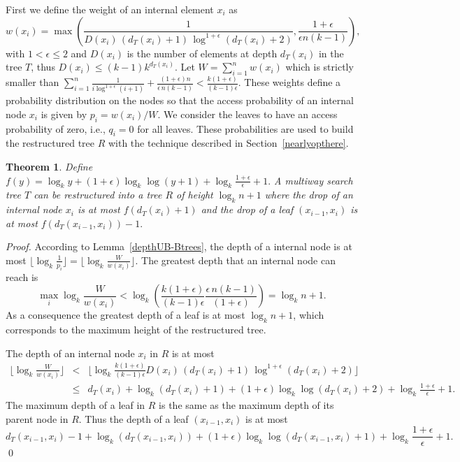 \documentclass{llncs}\usepackage[english]{babel}
\newtheorem{thm}{Theorem}
\begin{document}
First we define the weight of an internal element $x_i$ as
$$
w(x_i)=\max \left( \frac{1}{D(x_i) \, (d_T(x_i)+1)\, \log^{1+\epsilon}(d_T(x_i)+2)},\frac{1+\epsilon}{\epsilon n (k-1)} \right),
$$
with $1<\epsilon \leq 2$ and $D(x_i)$ is the number of elements at depth $d_T(x_i)$ in the tree $T$, thus $D(x_i)\leq (k-1)k^{d_T(x_i)}$. Let $W=\sum_{i=1}^{n}w(x_i)$ which is strictly smaller than $\sum_{i=1}^{n}\frac{1}{i \log^{1+\epsilon}(i+1)}+\frac{(1+\epsilon)n}{\epsilon \,n (k-1)}<\frac{k(1+\epsilon)}{(k-1)\epsilon}$. These weights define a probability distribution on the nodes so that the access probability of an internal node $x_i$ is given by $p_i=w(x_i)/W$. We consider the leaves to have an access probability of zero, i.e., $q_i=0$ for all leaves. These probabilities are used to build the restructured tree $R$ with the technique described in Section~\ref{nearlyopthere}. 
\begin{thm}
\label{dropdepth1}
Define $f(y)=\log_k y + (1+\epsilon)\log_k \log (y+1) + \log_k \frac{1+\epsilon}{\epsilon}+1.$ A multiway search tree $T$ can be restructured into a tree $R$ of height $ \log_{k} n +1$ where the drop of an internal node $x_i$ is at most $f(d_T(x_i)+1) $ and the drop of a leaf $(x_{i-1},x_i)$ is at most $f(d_T(x_{i-1},x_i))-1.$
\end{thm}
\begin{proof}
According to Lemma~\ref{depthUB-Btrees}, the depth of a internal node is at most $\lfloor \log_{k} \frac{1}{p_i}\rfloor= \lfloor \log_{k} \frac{W}{w(x_i)}\rfloor$. The greatest depth that an internal node can reach is  $$\max_i \log_{k} \frac{W}{w(x_i)}< \log_{k} \left(\frac{k(1+\epsilon)}{(k-1)\epsilon}\frac{\epsilon \, n(k-1)}{(1+\epsilon)}\right)=  \log_{k} n +1.$$ As a consequence the greatest depth of a leaf is at most $ \log_{k} n+1$, which corresponds to the maximum height of the restructured tree.

The depth of an internal node $x_i$ in $R$ is at most 
\begin{eqnarray*}
\lfloor \log_{k} \frac{W}{w(x_i)}\rfloor &<& \lfloor \log_{k} \frac{k(1+\epsilon)}{(k-1)\epsilon}D(x_i) \, (d_T(x_i)+1)\, \log^{1+\epsilon}(d_T(x_i)+2)\rfloor \\
&\leq &d_T(x_i)+\log_{k} (d_T(x_i)+1) + (1+\epsilon) \log_{k} \log (d_T(x_i)+2)+\log_k \frac{1+\epsilon}{\epsilon}+1.
\end{eqnarray*}
The maximum depth of a leaf in $R$ is the same as the maximum depth of its parent node in $R$. Thus the depth of a leaf $(x_{i-1},x_i)$ is at most $$d_T(x_{i-1},x_i)-1 +\log_{k} (d_T(x_{i-1},x_i)) + (1+\epsilon) \log_{k} \log (d_T(x_{i-1},x_i)+1) +\log_k \frac{1+\epsilon}{\epsilon}+1 .$$
\qed \end{proof}
\end{document}
